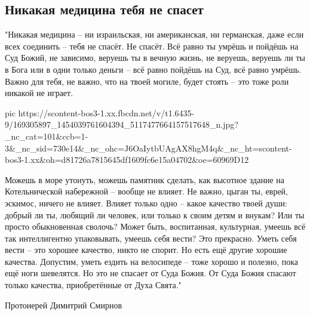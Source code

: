  
 
 
 
 

\subsection{Никакая медицина тебя не спасет}
\label{sec:08_04_2021.fb.maslov_evgenij.1.dusha_sud}

"Никакая медицина – ни израильская, ни американская, ни германская, даже
если всех соединить – тебя не спасёт. Не спасёт. Всё равно ты умрёшь и
пойдёшь на Суд Божий, не зависимо, веруешь ты в вечную жизнь, не веруешь,
веруешь ли ты в Бога или в одни только деньги – всё равно пойдёшь на Суд,
всё равно умрёшь. Важно для тебя, не важно, что на твоей могиле, будет
стоять – это тоже роли никакой не играет. 

\ifcmt
  pic https://scontent-bos3-1.xx.fbcdn.net/v/t1.6435-9/169305897_1454039761604394_5117477664157517648_n.jpg?_nc_cat=101&ccb=1-3&_nc_sid=730e14&_nc_ohc=J6OaIytbUAgAX8hgM4q&_nc_ht=scontent-bos3-1.xx&oh=d81726a7815645df1609fc6e15a04702&oe=60969D12
\fi

Можешь в море утонуть, можешь памятник сделать, как высотное здание на
Котельнической набережной – вообще не влияет. Не важно, цыган ты, еврей,
эскимос, ничего не влияет. Влияет только одно – какое качество твоей души:
добрый ли ты, любящий ли человек, или только к своим детям и внукам? Или ты
просто обыкновенная сволочь? Может быть, воспитанная, культурная, умеешь всё
так интеллигентно упаковывать, умеешь себя вести? Это прекрасно. Уметь себя
вести – это хорошее качество, никто не спорит. Но есть ещё другие хорошие
качества. Допустим, уметь ездить на велосипеде – тоже хорошо и полезно, пока
ещё ноги шевелятся. Но это не спасает от Суда Божия. От Суда Божия спасают
только качества, приобретённые от Духа Свята."

Протоиерей Димитрий Смирнов
